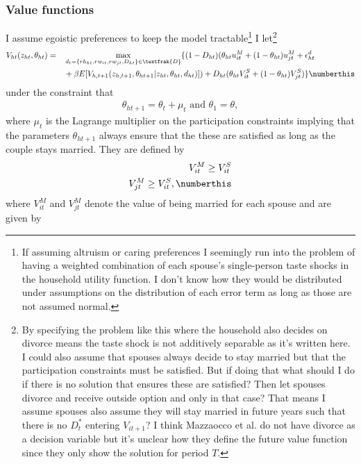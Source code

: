 \subsubsection{Value functions}
I assume egoistic preferences to keep the model tractable\footnote{If assuming altruism or caring preferences I seemingly run into the problem of having a weighted combination of each spouse's single-person taste shocks in the household utility function. I don't know how they would be distributed under assumptions on the distribution of each error term as long as those are not assumed normal.} I let\footnote{By specifying the problem like this where the household also decides on divorce means the taste shock is not additively separable as it's written here. I could also assume that spouses always decide to stay married but that the participation constraints must be satisfied. But if doing that what should I do if there is no solution that ensures these are satisfied? Then let spouses divorce and receive outside option and only in that case? That means I assume spouses also assume they will stay married in future years such that there is no $D_t^*$ entering $V_{it+1}$? I think Mazzaocco et al. do not have divorce as a decision variable but it's unclear how they define the future value function since they only show the solution for period $T$.} 
\begin{alignat*}{3}
&V_{ht}(z_{ht},\theta_{ht})=&&\max_{d_t=\{rh_{ht},rw_{it},rw_{jt},D_{ht}\}\in \textfrak{D}} \{(1-D_{ht})(\theta_{ht} u_{it}^M+(1-\theta_{ht})u_{jt}^M+\epsilon_{ht}^d \\
& &&+\beta E[V_{h,t+1}(z_{h,t+1},\theta_{ht+1}|z_{ht},\theta_{ht},d_{ht})])+D_{ht}(\theta_{ht} V_{it}^S+(1-\theta_{ht})V_{jt}^S)\} \numberthis
\label{eq:Vh}
\end{alignat*}
under the constraint that
\begin{align*}
\theta_{ht+1}=\theta_t+\mu_t \text{ and } \theta_1=\theta,
\end{align*}
where $\mu_t$ is the Lagrange multiplier on the participation constraints implying that the parameters $\theta_{ht+1}$ always ensure that the these are satisfied as long as the couple stays married. They are defined by
\begin{align*}
V_{it}^M \geq V_{it}^S \\
V_{jt}^M \geq V_{it}^S, \numberthis
\label{eq:pc}
\end{align*}
where $V_{it}^M$ and $V_{jt}^M$ denote the value of being married for each spouse and are given by
